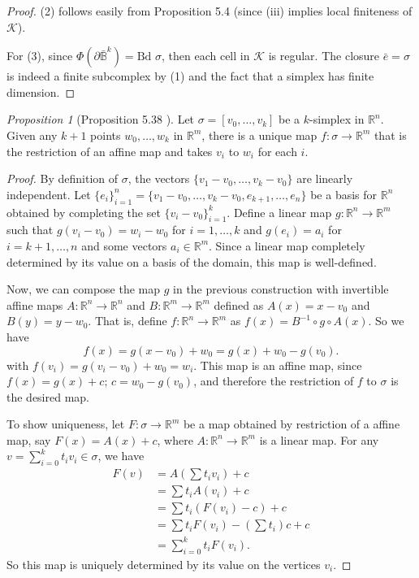 \documentclass[a4paper]{article}
\theoremstyle{remark}
\newtheorem{prop}{Proposition}
\newcommand{\er}{\mathbb{R}} %
\newcommand{\rn}{\mathbb{R}^n} %
\newcommand{\closedball}{\bar{\mathbb{B}}} %
\newcommand{\doo}{\partial}    %
\newcommand{\Bd}{\text{Bd }} %
\begin{document}
\begin{proof}
    (2) follows easily from Proposition 5.4 (since (iii) implies local finiteness of $\mathcal{K}$).
    
    For (3), since $\Phi (\doo \closedball^k) = \Bd \sigma$, then each cell in $\mathcal{K}$ is regular. The closure $\bar{e} = \sigma$ is indeed a finite subcomplex by (1) and the fact that a simplex has finite dimension.   
    
\end{proof}

\begin{prop}[Proposition 5.38 \cite{LeeTM}]
	Let $ \sigma = [v_0,\dots,v_k]$ be a $k$-simplex in $\rn$. Given any $k+1$ points $w_0,\dots,w_k$ in $\mathbb{R}^m$, there is a unique map $f : \sigma \to \er^m$ that is the restriction of an affine map and takes $v_i$ to $w_i$ for each $i$. 
\end{prop}
\begin{proof}
	By definition of $\sigma$, the vectors $\{v_1-v_0,\dots,v_k-v_0\}$ are linearly independent. Let $\{e_i\}_{i=1}^{n} = \{v_1-v_0,\dots,v_k-v_0,e_{k+1},\dots,e_n\}$ be a basis for $\rn$ obtained by completing the set $\{v_i-v_0\}_{i=1}^k$. Define a linear map  $g : \rn \to \er^m$ such that $g(v_i-v_0) =w_i-w_0$ for $i=1,\dots,k$ and $g(e_i) = a_i$ for $i=k+1 ,\dots, n$ and some vectors $a_i \in \er^m$. Since a linear map completely determined by its value on a basis of the domain, this map is well-defined.
	
	Now, we can compose the map $g$ in the previous construction with invertible affine maps $A : \rn \to \rn$ and $B : \er^m \to \er^m$ defined as $A(x) = x -v_0$ and $B(y) = y-w_0$. That is, define $f : \rn \to \er^m$ as $f(x) = B^{-1} \circ g \circ A (x)$. So we have
	$$
	f(x) = g(x-v_0) + w_0 = g(x) + w_0 - g(v_0).
	$$
	with $f(v_i) = g(v_i - v_0) + w_0 = w_i$. This map is an affine map, since $f(x) = g(x) + c ; \, c = w_0 - g(v_0)$, and therefore the restriction of $f$ to $\sigma$ is the desired map.
	
	To show uniqueness, let $F : \sigma \to \er^m$ be a map obtained by restriction of a affine map, say $F(x) = A(x) + c$, where $A : \rn \to \er^m$ is a linear map. For any $v = \sum_{i=0}^k t_i v_i \in \sigma$, we have
	\begin{align*}
		F(v) &= A(\sum t_i v_i) + c  \\ &= \sum t_i A(v_i) + c \\
		&= \sum t_i (F(v_i) - c) + c \\
		&= \sum t_i F(v_i) - (\sum t_i)c + c \\
		&= \sum_{i=0}^k t_i F(v_i).
	\end{align*}
	So this map is uniquely determined by its value on the vertices ${v_i}$.
\end{proof}
\end{document}

